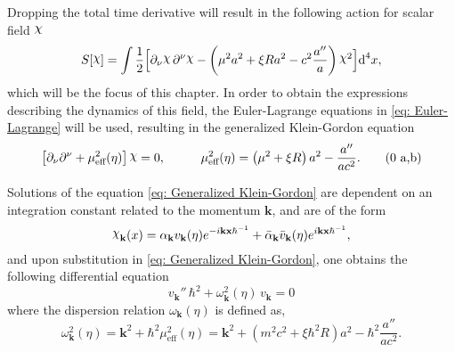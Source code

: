 Dropping the total time derivative will result in the following action for scalar field $\rchi$
\begin{equation}
	S[\rchi]=\int\frac{1}{2}\Big[\partial_\nu\rchi\,\partial^\nu\rchi-\left(\mu^2a^2+\xi R a^2-c^2\frac{a''}{a}\right)\rchi^2\Big]\td^4 x,
\end{equation}
which will be the focus of this chapter. In order to obtain the expressions describing the dynamics of this field, the Euler-Lagrange equations in \cref{eq: Euler-Lagrange} will be used, resulting in the generalized Klein-Gordon equation
\begin{subequations}\label{eq: Generalized Klein-Gordon}
	\begin{gather}
		\left[\partial_\nu\partial^\nu+\mu_{\text{eff}}^2(\eta)\right]\rchi=0,\hspace{1.0cm}\mu_{\text{eff}}^2(\eta)=\left(\mu^2+\xi R\right)a^2-\frac{a''}{ac^2}.\tag{\theequation \,\,a,b}
	\end{gather}
\end{subequations}

Solutions of the equation \ref{eq: Generalized Klein-Gordon} are dependent on an integration constant related to the momentum $\mathbf{k}$, and are of the form
\begin{equation}
	\rchi_{\mathbf{k}}(x)=\alpha_\mathbf{k}v_\mathbf{k}(\eta)e^{ -i\mathbf{kx}\hbar^{-1}}+\bar\alpha_\mathbf{k}\bar v_\mathbf{k}(\eta)e^{ i\mathbf{kx}\hbar^{-1}},
\end{equation}
and upon substitution in \eqref{eq: Generalized Klein-Gordon}, one obtains the following differential equation
\begin{equation}\label{eq: Expanding diff v}
	v_\mathbf{k}''\,\hbar^2+\omega^2_\mathbf{k}(\eta)\,v_\mathbf{k}=0
\end{equation}
where the dispersion relation $\omega_\mathbf{k}(\eta)$ is defined as,
\begin{equation}\label{eq: Expanding dispersion relation}
	\omega^2_{\mathbf k}(\eta)=\mathbf{k}^2+\hbar^2\mu_{\text{eff}}^2(\eta)=\mathbf{k}^2+\left(m^2c^2+\xi\hbar^2 R\right)a^2-\hbar^2\frac{a''}{ac^2}.
\end{equation}


